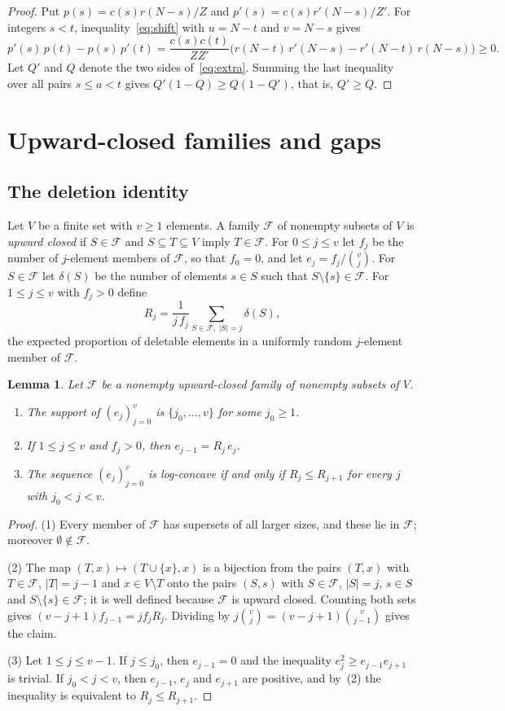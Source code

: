 \documentclass{amsart}
\newtheorem{lemma}[theorem]{Lemma}
\theoremstyle{definition}
\theoremstyle{remark}
\numberwithin{equation}{section}
\newcommand{\cF}{\mathcal{F}}
\begin{document}
\begin{proof}
Put $p(s)=c(s)r(N-s)/Z$ and $p'(s)=c(s)r'(N-s)/Z'$. For integers $s<t$, inequality~\eqref{eq:shift} with $u=N-t$ and $v=N-s$ gives
\[
p'(s)\,p(t)-p(s)\,p'(t)=\frac{c(s)c(t)}{ZZ'}\bigl(r(N-t)\,r'(N-s)-r'(N-t)\,r(N-s)\bigr)\ge0.
\]
Let $Q'$ and $Q$ denote the two sides of~\eqref{eq:extra}. Summing the last inequality over all pairs $s\le a<t$ gives $Q'(1-Q)\ge Q(1-Q')$, that is, $Q'\ge Q$.
\end{proof}

\section{Upward-closed families and gaps}\label{sec:families}

\subsection{The deletion identity}
Let $V$ be a finite set with $v\ge1$ elements. A family $\cF$ of nonempty subsets of $V$ is \emph{upward closed} if $S\in\cF$ and $S\subseteq T\subseteq V$ imply $T\in\cF$. For $0\le j\le v$ let $f_j$ be the number of $j$-element members of $\cF$, so that $f_0=0$, and let $e_j=f_j/\binom vj$. For $S\in\cF$ let $\delta(S)$ be the number of elements $s\in S$ such that $S\setminus\{s\}\in\cF$. For $1\le j\le v$ with $f_j>0$ define
\[
R_j=\frac{1}{j\,f_j}\sum_{S\in\cF,\ |S|=j}\delta(S),
\]
the expected proportion of deletable elements in a uniformly random $j$-element member of $\cF$.

\begin{lemma}\label{lem:deletion}
Let $\cF$ be a nonempty upward-closed family of nonempty subsets of $V$.
\begin{enumerate}
\item The support of $(e_j)_{j=0}^{v}$ is $\{j_0,\dots,v\}$ for some $j_0\ge1$.
\item If $1\le j\le v$ and $f_j>0$, then $e_{j-1}=R_j\,e_j$.
\item The sequence $(e_j)_{j=0}^{v}$ is log-concave if and only if $R_j\le R_{j+1}$ for every $j$ with $j_0<j<v$.
\end{enumerate}
\end{lemma}

\begin{proof}
(1) Every member of $\cF$ has supersets of all larger sizes, and these lie in $\cF$; moreover $\emptyset\notin\cF$.

(2) The map $(T,x)\mapsto(T\cup\{x\},x)$ is a bijection from the pairs $(T,x)$ with $T\in\cF$, $|T|=j-1$ and $x\in V\setminus T$ onto the pairs $(S,s)$ with $S\in\cF$, $|S|=j$, $s\in S$ and $S\setminus\{s\}\in\cF$; it is well defined because $\cF$ is upward closed. Counting both sets gives $(v-j+1)f_{j-1}=j f_jR_j$. Dividing by $j\binom vj=(v-j+1)\binom v{j-1}$ gives the claim.

(3) Let $1\le j\le v-1$. If $j\le j_0$, then $e_{j-1}=0$ and the inequality $e_j^2\ge e_{j-1}e_{j+1}$ is trivial. If $j_0<j<v$, then $e_{j-1}$, $e_j$ and $e_{j+1}$ are positive, and by~(2) the inequality is equivalent to $R_j\le R_{j+1}$.
\end{proof}
\end{document}
